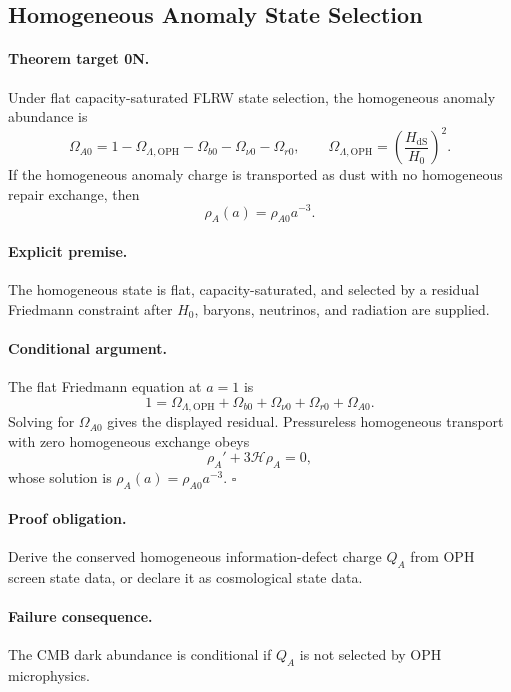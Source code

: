 \documentclass[11pt]{article}
\newcommand{\OPH}{\mathrm{OPH}}
\begin{document}
\subsection{Homogeneous Anomaly State Selection}

\paragraph{Theorem target 0N.}
Under flat capacity-saturated FLRW state selection, the homogeneous anomaly
abundance is
\begin{equation}
  \Omega_{A0}
  =
  1-\Omega_{\Lambda,\OPH}
   -\Omega_{b0}-\Omega_{\nu0}-\Omega_{r0},
  \qquad
  \Omega_{\Lambda,\OPH}
  =
  \left(\frac{H_{\mathrm{dS}}}{H_0}\right)^2.
\end{equation}
If the homogeneous anomaly charge is transported as dust with no homogeneous
repair exchange, then
\begin{equation}
  \rho_A(a)=\rho_{A0}a^{-3}.
\end{equation}

\paragraph{Explicit premise.}
The homogeneous state is flat, capacity-saturated, and selected by a residual
Friedmann constraint after \(H_0\), baryons, neutrinos, and radiation are
supplied.

\paragraph{Conditional argument.}
The flat Friedmann equation at \(a=1\) is
\begin{equation}
  1
  =
  \Omega_{\Lambda,\OPH}
  +\Omega_{b0}+\Omega_{\nu0}+\Omega_{r0}+\Omega_{A0}.
\end{equation}
Solving for \(\Omega_{A0}\) gives the displayed residual.  Pressureless
homogeneous transport with zero homogeneous exchange obeys
\[
  \rho_A'+3\mathcal H\rho_A=0,
\]
whose solution is \(\rho_A(a)=\rho_{A0}a^{-3}\). \(\square\)

\paragraph{Proof obligation.}
Derive the conserved homogeneous information-defect charge \(Q_A\) from OPH
screen state data, or declare it as cosmological state data.

\paragraph{Failure consequence.}
The CMB dark abundance is conditional if \(Q_A\) is not selected by OPH
microphysics.
\end{document}
